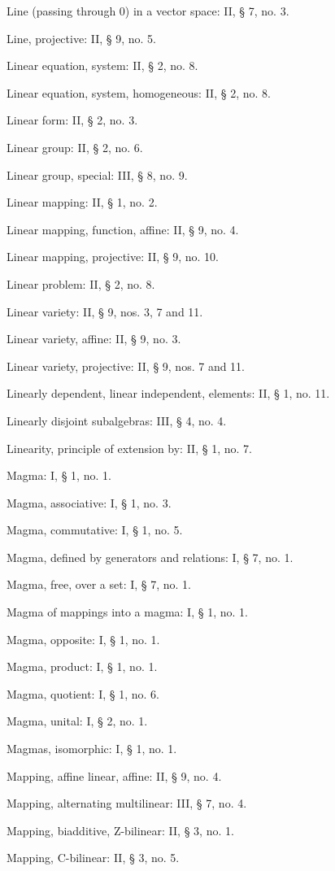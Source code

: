 Line (passing through 0) in a vector space: II, § 7, no. 3.

Line, projective: II, § 9, no. 5.

Linear equation, system: II, § 2, no. 8.

Linear equation, system, homogeneous: II, § 2, no. 8.

Linear form: II, § 2, no. 3.

Linear group: II, § 2, no. 6.

Linear group, special: III, § 8, no. 9.

Linear mapping: II, § 1, no. 2.

Linear mapping, function, affine: II, § 9, no. 4.

Linear mapping, projective: II, § 9, no. 10.

Linear problem: II, § 2, no. 8.

Linear variety: II, § 9, nos. 3, 7 and 11.

Linear variety, affine: II, § 9, no. 3.

Linear variety, projective: II, § 9, nos. 7 and 11.

Linearly dependent, linear independent, elements: II, § 1, no. 11.

Linearly disjoint subalgebras: III, § 4, no. 4.

Linearity, principle of extension by: II, § 1, no. 7.

Magma: I, § 1, no. 1.

Magma, associative: I, § 1, no. 3.

Magma, commutative: I, § 1, no. 5.

Magma, defined by generators and relations: I, § 7, no. 1.

Magma, free, over a set: I, § 7, no. 1.

Magma of mappings into a magma: I, § 1, no. 1.

Magma, opposite: I, § 1, no. 1.

Magma, product: I, § 1, no. 1.

Magma, quotient: I, § 1, no. 6.

Magma, unital: I, § 2, no. 1.

Magmas, isomorphic: I, § 1, no. 1.

Mapping, affine linear, affine: II, § 9, no. 4.

Mapping, alternating multilinear: III, § 7, no. 4.

Mapping, biadditive, Z-bilinear: II, § 3, no. 1.

Mapping, C-bilinear: II, § 3, no. 5.

